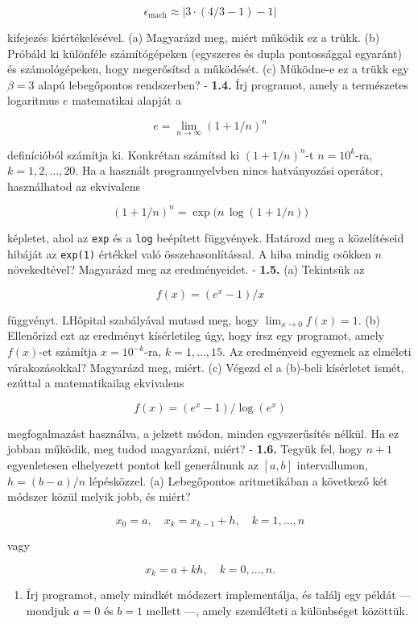 \documentclass[
  magyar,
  11pt]{article}
\providecommand{\tightlist}{%
  \setlength{\itemsep}{0pt}\setlength{\parskip}{0pt}}
\begin{document}
\[\epsilon_{\text{mach}} \approx |3 \cdot (4/3 - 1) - 1|\]

kifejezés kiértékelésével. (a) Magyarázd meg, miért működik ez a trükk.
(b) Próbáld ki különféle számítógépeken (egyszeres és dupla pontossággal
egyaránt) és számológépeken, hogy megerősítsd a működését. (c) Működne-e
ez a trükk egy \(\beta = 3\) alapú lebegőpontos rendszerben? -
\textbf{1.4.} Írj programot, amely a természetes logaritmus \(e\)
matematikai alapját a

\[e = \lim_{n \to \infty} (1 + 1/n)^n\]

definícióból számítja ki. Konkrétan számítsd ki \((1 + 1/n)^n\)-t
\(n = 10^k\)-ra, \(k = 1, 2, \dots, 20\). Ha a használt programnyelvben
nincs hatványozási operátor, használhatod az ekvivalens

\[(1 + 1/n)^n = \exp\bigl(n\,\log(1 + 1/n)\bigr)\]

képletet, ahol az \texttt{exp} és a \texttt{log} beépített függvények.
Határozd meg a közelítéseid hibáját az \texttt{exp(1)} értékkel való
összehasonlítással. A hiba mindig csökken \(n\) növekedtével? Magyarázd
meg az eredményeidet. - \textbf{1.5.} (a) Tekintsük az

\[f(x) = (e^x - 1)/x\]

függvényt. L\textquotesingle Hôpital szabályával mutasd meg, hogy
\(\lim_{x \to 0} f(x) = 1\). (b) Ellenőrizd ezt az eredményt
kísérletileg úgy, hogy írsz egy programot, amely \(f(x)\)-et számítja
\(x = 10^{-k}\)-ra, \(k = 1, \dots, 15\). Az eredményeid egyeznek az
elméleti várakozásokkal? Magyarázd meg, miért. (c) Végezd el a (b)-beli
kísérletet ismét, ezúttal a matematikailag ekvivalens

\[f(x) = (e^x - 1)/\log(e^x)\]

megfogalmazást használva, a jelzett módon, minden egyszerűsítés nélkül.
Ha ez jobban működik, meg tudod magyarázni, miért? - \textbf{1.6.}
Tegyük fel, hogy \(n + 1\) egyenletesen elhelyezett pontot kell
generálnunk az \([a, b]\) intervallumon, \(h = (b - a)/n\) lépésközzel.
(a) Lebegőpontos aritmetikában a következő két módszer közül melyik
jobb, és miért?

\[x_0 = a, \quad x_k = x_{k-1} + h, \quad k = 1, \dots, n\]

vagy

\[x_k = a + kh, \quad k = 0, \dots, n.\]

\begin{enumerate}
\def\labelenumi{(\alph{enumi})}
\setcounter{enumi}{1}
\tightlist
\item
  Írj programot, amely mindkét módszert implementálja, és találj egy
  példát --- mondjuk \(a = 0\) és \(b = 1\) mellett ---, amely
  szemlélteti a különbséget közöttük.
\end{enumerate}
\end{document}
